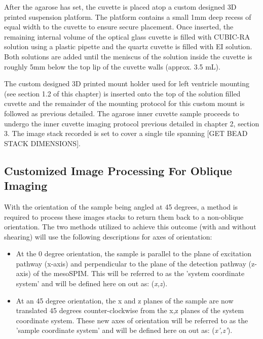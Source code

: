 After the agarose has set, the cuvette is placed atop a custom designed 3D printed suspension platform. The platform contains a small 1mm deep recess of equal width to the cuvette to ensure secure placement. Once inserted, the remaining internal volume of the optical glass cuvette is filled with CUBIC-RA solution using a plastic pipette and the quartz cuvette is filled with EI solution. Both solutions are added until the meniscus of the solution inside the cuvette is roughly 5mm below the top lip of the cuvette walls (approx. 3.5 mL). 

The custom designed 3D printed mount holder used for left ventricle mounting (see section 1.2 of this chapter) is inserted onto the top of the solution filled cuvette and the remainder of the mounting protocol for this custom mount is followed as previous detailed. The agarose inner cuvette sample proceeds to undergo the inner cuvette imaging protocol previous detailed in chapter 2, section 3. The image stack recorded is set to cover a single tile spanning [GET BEAD STACK DIMENSIONS]. 

\subsection{Customized Image Processing For Oblique Imaging}

With the orientation of the sample being angled at 45 degrees, a method is required to process these images stacks to return them back to a non-oblique orientation. The two methods utilized to achieve this outcome (with and without shearing) will use the following descriptions for axes of orientation: 

\begin{itemize}
    \item At the 0 degree orientation, the sample is parallel to the plane of excitation pathway (x-axis) and perpendicular to the plane of the detection pathway (z-axis) of the mesoSPIM. This will be referred to as the 'system coordinate system' and will be defined here on out as: (\textit{x,z}). 
 
 \item At an 45 degree orientation, the x and z planes of the sample are now translated 45 degrees counter-clockwise from the x,z planes of the system coordinate system. These new axes of orientation will be referred to as the 'sample coordinate system' and will be defined here on out as: (\textit{x',z'}).
\end{itemize}

